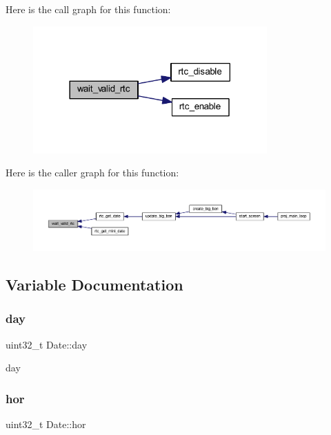 Here is the call graph for this function\+:
\nopagebreak
\begin{figure}[H]
\begin{center}
\leavevmode
\includegraphics[width=254pt]{group__rtc_ga74509feeac5ce275416f0239f4d92776_cgraph}
\end{center}
\end{figure}
Here is the caller graph for this function\+:
\nopagebreak
\begin{figure}[H]
\begin{center}
\leavevmode
\includegraphics[width=350pt]{group__rtc_ga74509feeac5ce275416f0239f4d92776_icgraph}
\end{center}
\end{figure}


\subsection{Variable Documentation}
\mbox{\label{group__rtc_gab435b6ac408b48a2edc5838cdc8aa914}} 
\subsubsection{\texorpdfstring{day}{day}}
{\footnotesize\ttfamily uint32\+\_\+t Date\+::day}



day 

\mbox{\label{group__rtc_gaa5ba3c37c4f61fa5ec64580241ecdb4c}} 
\subsubsection{\texorpdfstring{hor}{hor}\hspace{0.1cm}{\footnotesize\ttfamily [1/2]}}
{\footnotesize\ttfamily uint32\+\_\+t Date\+::hor}



